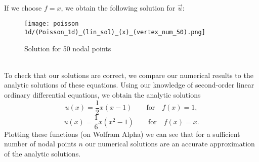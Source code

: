 \documentclass{article}
\begin{document}
\\
\\
\\
If we choose $f = x$, we obtain the following solution for $\vec{u}$:
\begin{figure}[hbt!]
    \centering
    \texttt{[image: poisson 1d/(Poisson\_1d)\_(lin\_sol)\_(x)\_(vertex\_num\_50).png]}
    \caption{Solution for 50 nodal points}
    \label{fig:linear basis sum}
\end{figure}
\\
To check that our solutions are correct, we compare our numerical results to the analytic solutions of these equations. Using our knowledge of second-order linear ordinary differential equations, we obtain the analytic solutions  $$u(x) = \frac{1}{2} x(x - 1)  \qquad \textrm{for} \quad f(x) = 1,$$ 
$$u(x) = \frac{1}{6} x(x^2 - 1) \qquad \textrm{for} \quad f(x) = x.$$
Plotting these functions (on Wolfram Alpha) we can see that for a sufficient number of nodal points $n$ our numerical solutions are an accurate approximation of the analytic solutions.
\end{document}
